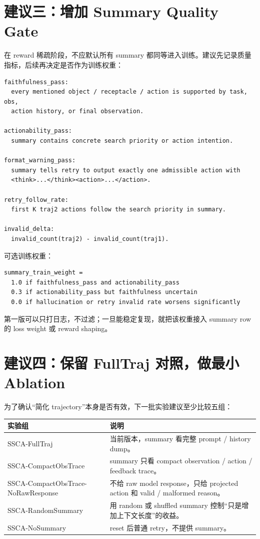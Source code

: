 \documentclass[10pt]{ctexart}
\begin{document}
\section{建议三：增加 Summary Quality Gate}
在 reward 稀疏阶段，不应默认所有 summary 都同等进入训练。建议先记录质量指标，后续再决定是否作为训练权重：
\begin{lstlisting}
faithfulness_pass:
  every mentioned object / receptacle / action is supported by task, obs,
  action history, or final observation.

actionability_pass:
  summary contains concrete search priority or action intention.

format_warning_pass:
  summary tells retry to output exactly one admissible action with
  <think>...</think><action>...</action>.

retry_follow_rate:
  first K traj2 actions follow the search priority in summary.

invalid_delta:
  invalid_count(traj2) - invalid_count(traj1).
\end{lstlisting}

可选训练权重：
\begin{lstlisting}
summary_train_weight =
  1.0 if faithfulness_pass and actionability_pass
  0.3 if actionability_pass but faithfulness uncertain
  0.0 if hallucination or retry invalid rate worsens significantly
\end{lstlisting}

第一版可以只打日志，不过滤；一旦能稳定复现，就把该权重接入 summary row 的 loss weight 或 reward shaping。

\section{建议四：保留 FullTraj 对照，做最小 Ablation}
为了确认“简化 trajectory”本身是否有效，下一批实验建议至少比较五组：
\begin{center}
\small
\begin{tabularx}{\linewidth}{lX}
\toprule
实验组 & 说明 \\
\midrule
SSCA-FullTraj & 当前版本，summary 看完整 prompt / history dump。 \\
SSCA-CompactObsTrace & summary 只看 compact observation / action / feedback trace。 \\
SSCA-CompactObsTrace-NoRawResponse & 不给 raw model response，只给 projected action 和 valid / malformed reason。 \\
SSCA-RandomSummary & 用 random 或 shuffled summary 控制“只是增加上下文长度”的收益。 \\
SSCA-NoSummary & reset 后普通 retry，不提供 summary。 \\
\bottomrule
\end{tabularx}
\end{center}
\end{document}

